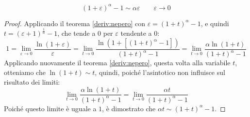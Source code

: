 \begin{teor}
	\label{deriv:nepero3}
	\[
		(1+\varepsilon)^\alpha-1\sim\alpha\varepsilon\qquad\varepsilon\to0
	\]
\end{teor}
\begin{proof}
	Applicando il teorema \ref{deriv:nepero} con $\varepsilon=(1+t)^\alpha-1$, e quindi $t=(\varepsilon+1)^{\frac{1}{\alpha}}-1$, che tende a $0$ per $\varepsilon$ tendente a $0$:
	\[
		1=\lim_{\varepsilon\to0}\frac{\ln (1+\varepsilon)}{\varepsilon}=\lim_{t\to0}\frac{\ln(1+[(1+t)^\alpha-1])}{(1+t)^\alpha-1}=\lim_{t\to0}\frac{\alpha\ln(1+t)}{(1+t)^\alpha-1}
	\]
	Applicando nuovamente il teorema \ref{deriv:nepero}, questa volta alla variabile $t$, otteniamo che $\ln(1+t)\sim t$, quindi, poiché l'asintotico non influisce sul risultato dei limiti:
	\[
		\lim_{t\to0}\frac{\alpha\ln(1+t)}{(1+t)^\alpha-1}=\lim_{t\to0}\frac{\alpha t}{(1+t)^\alpha-1}
	\]
	Poiché questo limite è uguale a $1$, è dimostrato che $\alpha t\sim (1+t)^\alpha-1$.
\end{proof}

